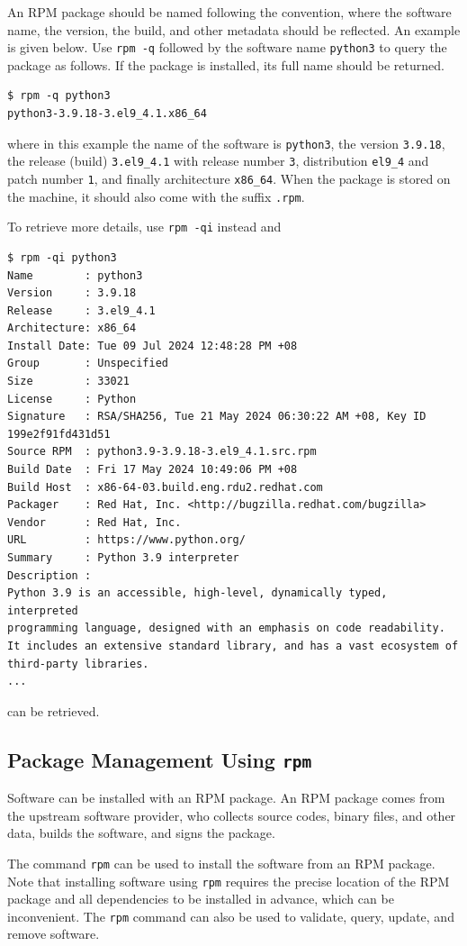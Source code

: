 An RPM package should be named following the convention, where the software name, the version, the build, and other metadata should be reflected. An example is given below. Use \verb|rpm -q| followed by the software name \verb|python3| to query the package as follows. If the package is installed, its full name should be returned.
\begin{lstlisting}
$ rpm -q python3
python3-3.9.18-3.el9_4.1.x86_64
\end{lstlisting}
where in this example the name of the software is \verb|python3|, the version \verb|3.9.18|, the release (build) \verb|3.el9_4.1| with release number \verb|3|, distribution \verb|el9_4| and patch number \verb|1|, and finally architecture \verb|x86_64|. When the package is stored on the machine, it should also come with the suffix \verb|.rpm|. 

To retrieve more details, use \verb|rpm -qi| instead and
\begin{lstlisting}
$ rpm -qi python3
Name        : python3
Version     : 3.9.18
Release     : 3.el9_4.1
Architecture: x86_64
Install Date: Tue 09 Jul 2024 12:48:28 PM +08
Group       : Unspecified
Size        : 33021
License     : Python
Signature   : RSA/SHA256, Tue 21 May 2024 06:30:22 AM +08, Key ID 199e2f91fd431d51
Source RPM  : python3.9-3.9.18-3.el9_4.1.src.rpm
Build Date  : Fri 17 May 2024 10:49:06 PM +08
Build Host  : x86-64-03.build.eng.rdu2.redhat.com
Packager    : Red Hat, Inc. <http://bugzilla.redhat.com/bugzilla>
Vendor      : Red Hat, Inc.
URL         : https://www.python.org/
Summary     : Python 3.9 interpreter
Description :
Python 3.9 is an accessible, high-level, dynamically typed, interpreted
programming language, designed with an emphasis on code readability.
It includes an extensive standard library, and has a vast ecosystem of
third-party libraries.
...
\end{lstlisting}
can be retrieved.

\subsection{Package Management Using \texttt{rpm}}

Software can be installed with an RPM package. An RPM package comes from the upstream software provider, who collects source codes, binary files, and other data, builds the software, and signs the package.

The command \verb|rpm| can be used to install the software from an RPM package. Note that installing software using \verb|rpm| requires the precise location of the RPM package and all dependencies to be installed in advance, which can be inconvenient. The \verb|rpm| command can also be used to validate, query, update, and remove software.

